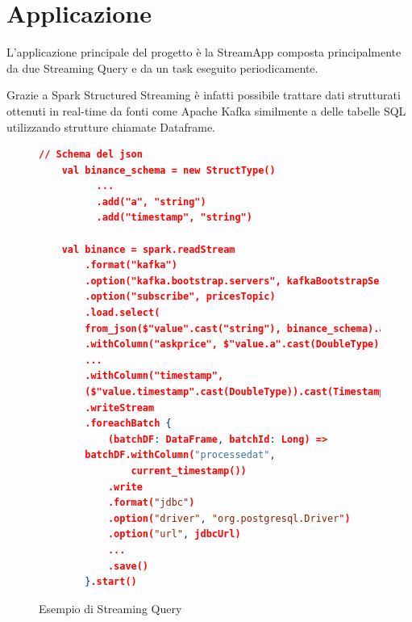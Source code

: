 \section{Applicazione}

L'applicazione principale del progetto è la StreamApp composta principalmente da due Streaming
Query e da un task eseguito periodicamente.

Grazie a Spark Structured Streaming è infatti possibile trattare dati strutturati ottenuti in
real-time da fonti come Apache Kafka similmente a delle tabelle SQL utilizzando strutture chiamate
Dataframe.

\begin{figure}
    \begin{lstlisting}[language=json,firstnumber=1]
    // Schema del json
    val binance_schema = new StructType()
          ...
          .add("a", "string")
          .add("timestamp", "string")
    
    val binance = spark.readStream
        .format("kafka")
        .option("kafka.bootstrap.servers", kafkaBootstrapServers)
        .option("subscribe", pricesTopic)
        .load.select(
        from_json($"value".cast("string"), binance_schema).alias("value"))
        .withColumn("askprice", $"value.a".cast(DoubleType))
        ...
        .withColumn("timestamp",
        ($"value.timestamp".cast(DoubleType)).cast(TimestampType))
        .writeStream
        .foreachBatch {
            (batchDF: DataFrame, batchId: Long) =>
        batchDF.withColumn("processedat",
                current_timestamp())
            .write
            .format("jdbc")
            .option("driver", "org.postgresql.Driver")
            .option("url", jdbcUrl)
            ...
            .save()
        }.start()
    \end{lstlisting}
    \caption{Esempio di Streaming Query}
    \label{streamingquery}
    \end{figure}

